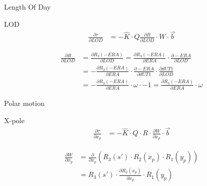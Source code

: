 \documentclass[14pt,table,t, c]{beamer}
\begin{document}
\begin{frame}{Length Of Day}
\begin{block}{LOD}
\vspace*{-\baselineskip}\setlength\belowdisplayskip{0pt}\setlength\abovedisplayskip{0pt}
\begin{align*}
\frac{\partial \tau}{\partial LOD} &= - \hat{K} \cdot Q \frac{\partial R}{\partial LOD} \cdot W
\cdot \vec{b}
\end{align*}
\end{block}
\begin{block}{\vspace*{-3ex}}
\vspace*{-\baselineskip}\setlength\belowdisplayskip{0pt}\setlength\abovedisplayskip{5pt}
\begin{align*}
\frac{\partial R}{\partial LOD} &= \frac{\partial R_3(-ERA)}{\partial LOD}
= \frac{\partial R_3(-ERA)}{\partial ERA}\cdot \frac{\partial -ERA}{\partial LOD} \\
&= -\frac{\partial R_3(-ERA)}{\partial ERA}\cdot \frac{\partial -ERA}{\partial dUT1} \cdot \frac{\partial dUT1}{\partial
LOD} \\
&= -\frac{\partial R_3(-ERA)}{\partial ERA}\cdot \omega \cdot -1
= \frac{\partial R_3(-ERA)}{\partial ERA}\cdot \omega
\end{align*}
\end{block}
\end{frame}

\begin{frame}{Polar motion}
\begin{block}{X-pole}
\vspace*{-\baselineskip}\setlength\belowdisplayskip{0pt}\setlength\abovedisplayskip{0pt}
\begin{align*}
\frac{\partial \tau}{\partial x_p} &= - \hat{K} \cdot Q \cdot R \cdot \frac{\partial W}{\partial x_p}
\cdot \vec{b}
\end{align*}
\end{block}
\begin{block}{\vspace*{-3ex}}
\vspace*{-\baselineskip}\setlength\belowdisplayskip{0pt}\setlength\abovedisplayskip{5pt}
\begin{align*}
\frac{\partial W}{\partial x_p} &= \frac{\partial }{\partial x_p} (R_3(s') \cdot R_2(x_p) \cdot R_1(y_p)) \\
&= R_3(s') \cdot \frac{\partial R_2(x_p)}{\partial x_p} \cdot R_1(y_p) 
\end{align*}
\end{block}
\end{frame}
\end{document}
